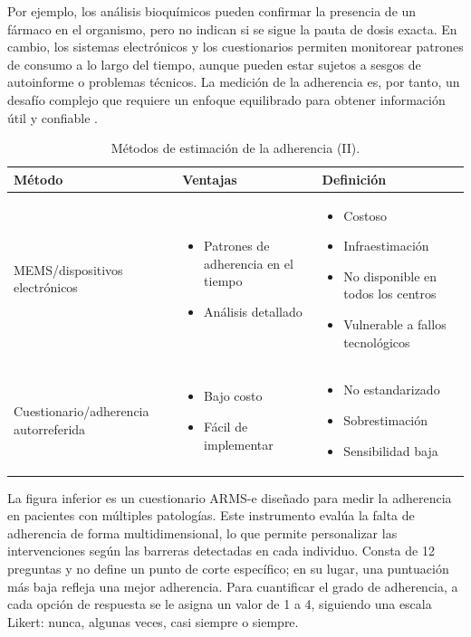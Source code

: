 Por ejemplo, los análisis bioquímicos pueden confirmar la presencia de un fármaco en el organismo, pero no indican si se sigue la pauta de dosis exacta. En cambio, los sistemas electrónicos y los cuestionarios permiten monitorear patrones de consumo a lo largo del tiempo, aunque pueden estar sujetos a sesgos de autoinforme o problemas técnicos. La medición de la adherencia es, por tanto, un desafío complejo que requiere un enfoque equilibrado para obtener información útil y confiable \cite{ibarra2017adherencia}.

\newpage

\begin{table}[ht]
	\centering
	\label{my-label}
	\begin{tabular}{|p{4cm}|p{5.5cm}|p{5.5cm}|}
		\hline
		\textbf{Método} & \textbf{Ventajas} & \textbf{Definición} \\ \hline
MEMS/dispositivos electrónicos & 
\begin{itemize}
	\item Patrones de adherencia en el tiempo
	\item Análisis detallado
\end{itemize} & 
\begin{itemize}
	\item Costoso
	\item Infraestimación
	\item No disponible en todos los centros
	\item Vulnerable a fallos tecnológicos
\end{itemize} \\ \hline
Cuestionario/adherencia autorreferida & 
\begin{itemize}
	\item Bajo costo
	\item Fácil de implementar
\end{itemize} & 
\begin{itemize}
	\item No estandarizado
	\item Sobrestimación
	\item Sensibilidad baja
\end{itemize} \\ \hline
	\end{tabular}

\caption{Métodos de estimación de la adherencia (II).}
\end{table}

La figura inferior es un cuestionario ARMS-e diseñado para medir la adherencia en pacientes con múltiples patologías. Este instrumento evalúa la falta de adherencia de forma multidimensional, lo que permite personalizar las intervenciones según las barreras detectadas en cada individuo. Consta de 12 preguntas y no define un punto de corte específico; en su lugar, una puntuación más baja refleja una mejor adherencia. Para cuantificar el grado de adherencia, a cada opción de respuesta se le asigna un valor de 1 a 4, siguiendo una escala Likert: nunca, algunas veces, casi siempre o siempre. \cite{pages2018metodos}

